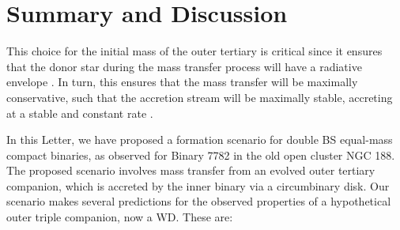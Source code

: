 \documentclass{aastex62}
\begin{document}
\section{Summary and Discussion} \label{discussion}



This
choice for the initial mass of the outer tertiary is critical since it
ensures that the donor star during the mass transfer process will have
a radiative envelope \citep[e.g.][]{maeder09}.  In turn, this ensures
that the mass transfer will be maximally conservative, such that the
accretion stream will be maximally stable, accreting at a stable and
constant rate \citep[e.g.][]{iben91}.

In this Letter, we have proposed a formation scenario for double BS equal-mass compact binaries, as observed for Binary 7782 in the old open cluster NGC 188.  The proposed scenario involves mass transfer from an evolved outer tertiary companion, which is accreted by the inner binary via a circumbinary disk.  Our scenario makes several predictions for the observed properties of a hypothetical outer triple companion, now a WD.  These are:
\end{document}
